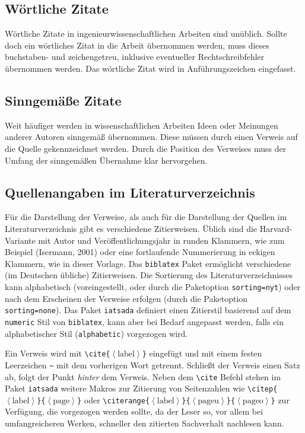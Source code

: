 \subsection*{Wörtliche Zitate}
Wörtliche Zitate in ingenieurwissenschaftlichen Arbeiten sind unüblich.
Sollte doch ein wörtliches Zitat in die Arbeit übernommen werden, muss dieses buchstaben- und zeichengetreu, inklusive eventueller Rechtschreibfehler übernommen werden.
Das wörtliche Zitat wird in Anführungszeichen eingefasst.

\subsection*{Sinngemäße Zitate}
Weit häufiger werden in wissenschaftlichen Arbeiten Ideen oder Meinungen anderer Autoren sinngemäß übernommen.
Diese müssen durch einen Verweis auf die Quelle gekennzeichnet werden.
Durch die Position des Verweises muss der Umfang der sinngemäßen Übernahme klar hervorgehen.

\subsection*{Quellenangaben im Literaturverzeichnis}
Für die Darstellung der Verweise, als auch für die Darstellung der Quellen im Literaturverzeichnis gibt es verschiedene Zitierweisen.
Üblich sind die Harvard-Variante mit Autor und Veröffentlichungsjahr in runden Klammern, wie zum Beispiel (Isermann, 2001) oder eine fortlaufende Nummerierung in eckigen Klammern, wie in dieser Vorlage.
Das \texttt{biblatex} Paket ermöglicht verschiedene (im Deutschen übliche) Zitierweisen.
Die Sortierung des Literaturverzeichnisses kann alphabetisch (voreingestellt, oder \bspw durch die Paketoption \texttt{sorting=nyt}) oder nach dem Erscheinen der Verweise erfolgen (durch die Paketoption \texttt{sorting=none}).
Das Paket \texttt{iatsada} definiert einen Zitierstil basierend auf dem \texttt{numeric} Stil von \texttt{biblatex}, kann aber bei Bedarf angepasst werden, falls \bspw ein alphabetischer Stil (\texttt{alphabetic}) vorgezogen wird.

Ein Verweis wird mit \texttt{\textbackslash{}cite\{$\left\langle\text{label}\right\rangle$\}} eingefügt und mit einem festen Leerzeichen \verb|~| mit dem vorherigen Wort getrennt.
Schließt der Verweis einen Satz ab, folgt der Punkt \emph{hinter} dem Verweis.
Neben dem \texttt{\textbackslash{}cite} Befehl stehen im Paket \texttt{iatsada} weitere Makros zur Zitierung von Seitenzahlen wie \texttt{\textbackslash{}citep\{$\left\langle\text{label}\right\rangle$\}\{$\left\langle\text{page}\right\rangle$\}} oder \texttt{\textbackslash{}citerange\{$\left\langle\text{label}\right\rangle$\}\{$\left\langle\text{pageu}\right\rangle$\}\{$\left\langle\text{pageo}\right\rangle$\}} zur Verfügung, die vorgezogen werden sollte, da der Leser so, vor allem bei umfangreicheren Werken, schneller den zitierten Sachverhalt nachlesen kann.

